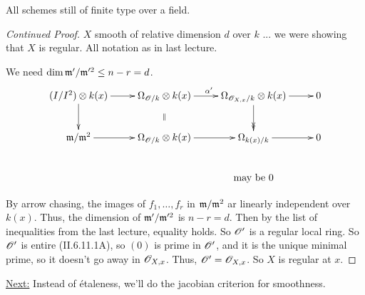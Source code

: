  \setcounter{lecture}{28}

 All schemes still of finite type over a field.

 \begin{proof}[Continued Proof]
 $X$ smooth of relative dimension $d$ over $k$ ... we were showing that $X$ is
 regular.  All notation as in last lecture.

 We need $\dim \mathfrak{m}'/\mathfrak{m}'^2 \le n-r=d$.
 \[\xymatrix{
    (I/I^2)\otimes k(x)\ar[d] \ar[r] & \Omega_{\O/k}\otimes k(x) \ar@{}[d]|{\parallel} \ar[r]^{\alpha'}
    & \Omega_{\O_{X,x}/k}\otimes k(x) \ar@{->>}[d] \ar[r] & 0\\
    \m/\m^2\ar[r] & \Omega_{\O/k}\otimes k(x) \ar[r] &
    \Omega_{k(x)/k} \ar[r] & 0\\
    & & \text{may be 0} &
 }\]

 By arrow chasing, the images of $f_1,\dots, f_r$ in $\mathfrak{m}/\mathfrak{m}^2$ ar linearly
 independent over $k(x)$.  Thus, the dimension of $\mathfrak{m}'/\mathfrak{m}'^2$ is $n-r=d$.  Then by
 the list of inequalities from the last lecture, equality holds.  So $\mathscr{O}'$ is a
 regular local ring.  So $\mathscr{O}'$ is entire (II.6.11.1A), so $(0)$ is prime in $\mathscr{O}'$,
 and it is the unique minimal prime, so it doesn't go away in $\mathscr{O}_{X,x}$.  Thus,
 $\mathscr{O}'=\mathscr{O}_{X,x}$.  So $X$ is regular at $x$.
 \end{proof}

 \underline{Next:} Instead of \'{e}taleness, we'll do the jacobian criterion for
 smoothness.

